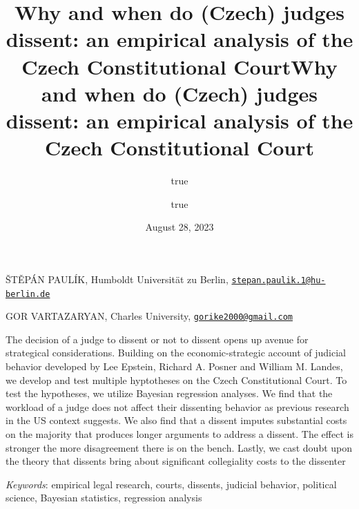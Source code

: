 \documentclass[
  11pt,
]{article}
\title{Why and when do (Czech) judges dissent: an empirical analysis of
the Czech Constitutional Court}
\author{true \and true}
\date{August 28, 2023}
\title{Why and when do (Czech) judges dissent: an empirical analysis of
the Czech Constitutional Court }
\date{}
\renewenvironment{abstract}
 {{%
    \setlength{\leftmargin}{0mm}
    \setlength{\rightmargin}{\leftmargin}%
  }%
  \relax}
 {\endlist}
\begin{document}



{%
\setlength{\parindent}{0pt}
\thispagestyle{plain}
{%
\maketitle  %

}




{
   \vskip 13.5pt\relax \normalsize\fontsize{11}{12}
   \MakeUppercase{Štěpán Paulík}, \small{Humboldt Universität zu Berlin,
\href{mailto:stepan.paulik.1@hu-berlin.de}{\nolinkurl{stepan.paulik.1@hu-berlin.de}}}   \par \vskip -3.5pt \MakeUppercase{Gor
Vartazaryan}, \small{Charles University,
\href{mailto:gorike2000@gmail.com}{\nolinkurl{gorike2000@gmail.com}}}   

}

}








\begin{abstract}


    \vskip 8.5pt %

\noindent \small{The decision of a judge to dissent or not to dissent
opens up avenue for strategical considerations. Building on the
economic-strategic account of judicial behavior developed by Lee
Epstein, Richard A. Posner and William M. Landes, we develop and test
multiple hyptotheses on the Czech Constitutional Court. To test the
hypotheses, we utilize Bayesian regression analyses. We find that the
workload of a judge does not affect their dissenting behavior as
previous research in the US context suggests. We also find that a
dissent imputes substantial costs on the majority that produces longer
arguments to address a dissent. The effect is stronger the more
disagreement there is on the bench. Lastly, we cast doubt upon the
theory that dissents bring about significant collegiality costs to the
dissenter}


\vskip 8.5pt \noindent \emph{Keywords}: empirical legal research,
courts, dissents, judicial behavior, political science, Bayesian
statistics, regression analysis \par




\end{abstract}
\end{document}
